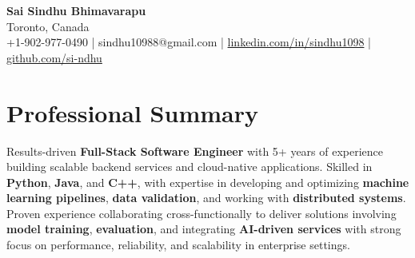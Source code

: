 \documentclass[letterpaper,11pt]{article}
\begin{document}
\begin{center}
  {\Large \textbf{Sai Sindhu Bhimavarapu}} \\
  Toronto, Canada \\
  +1-902-977-0490 \enspace | \enspace sindhu10988@gmail.com \enspace | \enspace \href{https://www.linkedin.com/in/sindhu1098/}{linkedin.com/in/sindhu1098} \enspace | \enspace \href{https://github.com/si-ndhu}{github.com/si-ndhu}
\end{center}

\section{Professional Summary}
  \begin{itemize}[leftmargin=0.15in, label={}]
    \small{\item{
     Results-driven \textbf{Full-Stack Software Engineer} with 5+ years of experience building scalable backend services and cloud-native applications. Skilled in \textbf{Python}, \textbf{Java}, and \textbf{C++}, with expertise in developing and optimizing \textbf{machine learning pipelines}, \textbf{data validation}, and working with \textbf{distributed systems}. Proven experience collaborating cross-functionally to deliver solutions involving \textbf{model training}, \textbf{evaluation}, and integrating \textbf{AI-driven services} with strong focus on performance, reliability, and scalability in enterprise settings.
    }}
  \end{itemize}
\vspace{-16pt}

\end{document}
